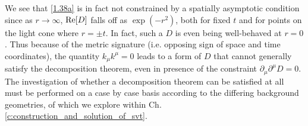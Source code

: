 %
We see that \eqref{1.38a} is in fact not constrained by a spatially asymptotic condition since 
as $r\rightarrow \infty$, ${\rm Re}[D]$ falls off as $\exp(-r^2)$, both for fixed $t$ and for points on the light cone where $r=\pm t$. In fact, such a $D$ is even being well-behaved at $r=0$. Thus because of the metric signature (i.e. opposing sign of space and time coordinates), the quantity $k_\mu k^\mu=0$ leads to a form of $D$ that cannot generally satisfy the decomposition theorem, even in presence of the constraint $\partial_\mu \partial^\mu D = 0$. The investigation of whether a decomposition theorem can be satisfied at all must be performed on a case by case basis according to the differing background geometries, of which we explore within Ch. \ref{c:construction_and_solution_of_svt}.
